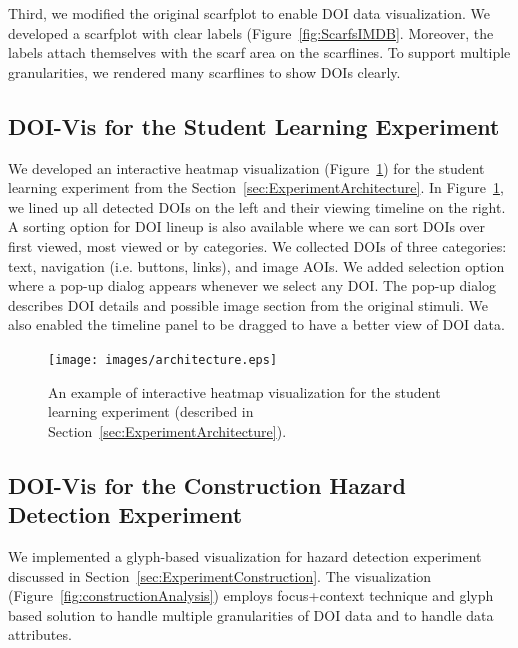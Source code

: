 Third, we modified the original scarfplot to enable DOI data visualization. We developed a scarfplot with clear labels (Figure~\ref{fig:ScarfsIMDB}. Moreover, the labels attach themselves with the scarf area on the scarflines. To support multiple granularities, we rendered many scarflines to show DOIs clearly. 

\subsection{DOI-Vis for the Student Learning Experiment}
We developed an interactive heatmap visualization (Figure~\ref{fig:HeatmapArchitecture}) for the student learning experiment from the Section~\ref{sec:ExperimentArchitecture}. In Figure~\ref{fig:HeatmapArchitecture}, we lined up all detected DOIs on the left and their viewing timeline on the right. A sorting option for DOI lineup is also available where we can sort DOIs over first viewed, most viewed or by categories. We collected DOIs of three categories: text, navigation (i.e. buttons, links), and image AOIs. We added selection option where a pop-up dialog appears whenever we select any DOI. The pop-up dialog describes DOI details and possible image section from the original stimuli. We also enabled the timeline panel to be dragged to have a better view of DOI data. 
\begin{figure}
  \centering
  \texttt{[image: images/architecture.eps]}
  \caption{An example of interactive heatmap visualization for the student learning experiment (described in Section~\ref{sec:ExperimentArchitecture}). }
	\label{fig:HeatmapArchitecture}
\end{figure}

\subsection{DOI-Vis for the Construction Hazard Detection Experiment}
We implemented a glyph-based visualization for hazard detection experiment discussed in Section~\ref{sec:ExperimentConstruction}. The visualization (Figure~\ref{fig:constructionAnalysis}) employs focus+context technique and glyph based solution to handle multiple granularities of DOI data and to handle data attributes. 

